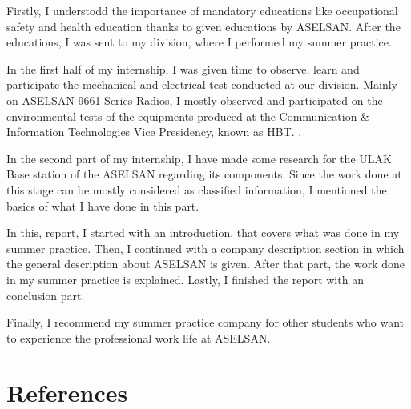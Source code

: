 	Firstly, I understodd the importance of mandatory educations like occupational safety and health education thanks to given educations by ASELSAN. After the educations, I was  sent to my division, where I performed my summer practice.
	
	In the first half of my internship, I was given time to observe, learn and participate the mechanical and electrical test conducted at our division. Mainly on ASELSAN 9661 Series Radios, I mostly observed and participated on the environmental tests of the equipments produced at the Communication \& Information Technologies Vice Presidency, known as HBT. .
	
	In the second part of my internship, I have made some research for the ULAK Base station of the ASELSAN regarding its components. Since the work done at this stage can be mostly considered as classified information, I mentioned the basics of what I have done in this part.
	
	In this, report, I started with an introduction, that covers what was done in my summer practice. Then, I continued with a company description section in which the general description about ASELSAN is given. After that part, the work done in my summer practice is explained. Lastly, I finished the report with an conclusion part. 
		
	
	Finally, I recommend my summer practice company for other students who want to experience the professional work life at ASELSAN. 

\-\vfill 


\section{References}

